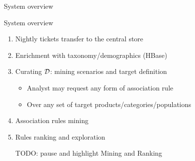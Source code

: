 \documentclass[table]{beamer}
\begin{document}
\begin{frame}{System overview}
\begin{figure}
  \end{figure}
\end{frame}

\begin{frame}{System overview}
  \begin{enumerate}
    \item Nightly tickets transfer to the central store
    \item Enrichment with taxonomy/demographics (HBase)
    \item Curating $\cal D$: mining scenarios and target definition\\
      \begin{itemize}
        \item Analyst may request any form of association rule
        \item Over any set of target products/categories/populations
      \end{itemize}
    \item Association rules mining
    \item Rules ranking and exploration

    TODO: pause and highlight Mining and Ranking
  \end{enumerate}
\end{frame}
\end{document}
